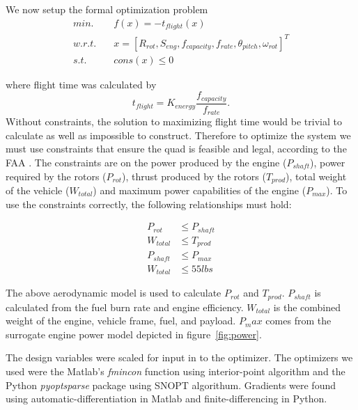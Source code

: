 \documentclass[letterpaper, 10 pt, conference]{ieeeconf}  %
\newcommand{\of}[1]{\ensuremath{\left(#1\right)}}
\begin{document}

We now setup the formal optimization problem
\begin{equation}
	\begin{split}
		min. & \quad f\of{x} = -t_{flight}\of{x} \\
		w.r.t. & \quad x = [R_{rot}, S_{eng}, f_{capacity}, f_{rate}, \theta_{pitch}, \omega_{rot}]^T \\
		s.t. & \quad cons\of{x} \leq 0 
	\end{split}
	\label{eq:objective}
\end{equation}

where flight time was calculated by 
\[
	t_{flight} = K_{energy}\frac{f_{capacity}}{f_{rate}}.
\]
Without constraints, the solution to maximizing flight time would be trivial to calculate as well as impossible to construct. Therefore to optimize the system we must use constraints that ensure the quad is feasible and legal, according to the FAA \cite{faa2016}. The constraints are on the power produced by the engine ($P_{shaft}$), power required by the rotors ($P_{rot}$), thrust produced by the rotors ($T_{prod}$), total weight of the vehicle ($W_{total}$) and maximum power capabilities of the engine ($P_{max}$). To use the constraints correctly, the following relationships must hold:

\[
	\begin{split}
	P_{rot} & \leq P_{shaft} \\
	W_{total} & \leq T_{prod} \\ 
	P_{shaft} & \leq P_{max} \\
	W_{total} & \leq 55 lbs
	\end{split}
\]

The above aerodynamic model is used to calculate $P_{rot}$ and $T_{prod}$. $P_{shaft}$ is calculated from the fuel burn rate and engine efficiency. $W_{total}$ is the combined weight of the engine, vehicle frame, fuel, and payload. $P_max$ comes from the surrogate engine power model depicted in figure~\ref{fig:power}.

The design variables were scaled for input in to the optimizer. The optimizers we used were the Matlab's \textit{fmincon} function using interior-point algorithm and the Python \textit{pyoptsparse} package using SNOPT algorithum. Gradients were found using automatic-differentiation in Matlab and finite-differencing in Python. 
\end{document}

